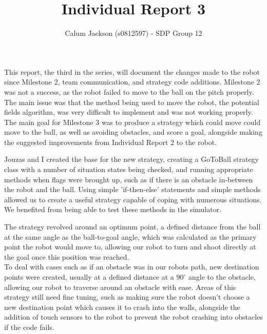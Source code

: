 \documentclass[12pt]{article}
\begin{document}
\title{Individual Report 3}
\author{Calum Jackson (s0812597) - 
SDP Group 12}
\maketitle
\begin{flushleft}

This report, the third in the series, will document the changes made to the robot since Milestone 2, team communication, and strategy code additions. Milestone 2 was not a success, as the robot failed to move to the ball on the pitch properly. The main issue was that the method being used to move the robot, the potential fields algorithm, was very difficult to implement and was not working properly. The main goal for Milestone 3 was to produce a strategy which could move could move to the ball, as well as avoiding obstacles, and score a goal, alongside making the suggested improvements from Individual Report 2 to the robot.\linebreak


Jouzas and I created the base for the new strategy, creating a GoToBall strategy class with a number of situation states being checked, and running appropriate methods when flags were brought up, such as if there is an obstacle in-between the robot and the ball. Using simple 'if-then-else' statements and simple methods allowed us to create a useful strategy capable of coping with numerous situations. We benefited from being able to test these methods in the simulator.\linebreak

The strategy revolved around an optimum point, a defined distance from the ball at the same angle as the ball-to-goal angle, which was calculated as the primary point the robot would move to, allowing our robot to turn and shoot directly at the goal once this position was reached.\\

To deal with cases such as if an obstacle was in our robots path, new destination points were created, usually at a defined distance at a $90^{\circ}$ angle to the obstacle, allowing our robot to traverse around an obstacle with ease.  Areas of this strategy still need fine tuning, such as making sure the robot doesn't choose a new destination point which causes it to crash into the walls, alongside the addition of touch sensors to the robot to prevent the robot crashing into obstacles if the code fails. \linebreak


\end{flushleft}
\end{document}
